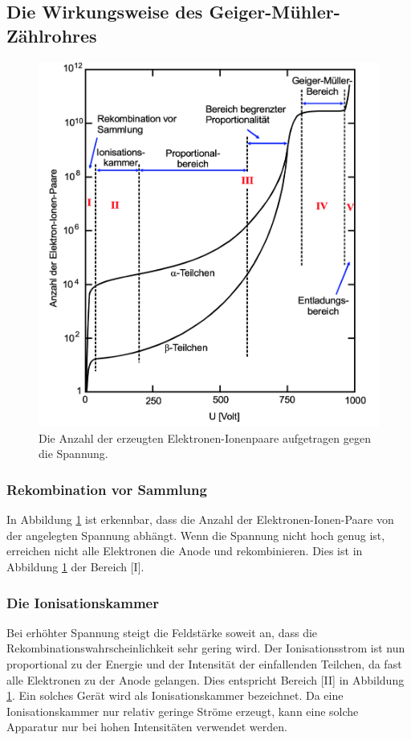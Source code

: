   \subsection{Die Wirkungsweise des Geiger-Mühler-Zählrohres}
    \begin{figure}[H]
      \centering
        \includegraphics[scale=0.4]{content/SpannungAnzahlElektronenGMZ.png}
        \caption{Die Anzahl der erzeugten Elektronen-Ionenpaare aufgetragen gegen die Spannung.}
          \label{fig:aufbau2}
    \end{figure}
    \noindent
    \subsubsection{Rekombination vor Sammlung}
      In Abbildung \ref{fig:aufbau2} ist erkennbar, dass die Anzahl der Elektronen-Ionen-Paare von der
      angelegten Spannung abhängt. Wenn die Spannung nicht hoch genug ist, erreichen nicht alle
      Elektronen die Anode und rekombinieren. Dies ist in Abbildung \ref{fig:aufbau2} der Bereich [I].
    \subsubsection{Die Ionisationskammer}
      Bei erhöhter Spannung steigt die Feldstärke soweit an, dass die Rekombinationswahrscheinlichkeit
      sehr gering wird. Der Ionisationsstrom ist nun proportional zu der Energie und der Intensität
      der einfallenden Teilchen, da fast alle Elektronen zu der Anode gelangen. Dies entspricht
      Bereich [II] in Abbildung \ref{fig:aufbau2}. Ein solches Gerät wird als Ionisationskammer
      bezeichnet. Da eine Ionisationskammer nur relativ geringe Ströme erzeugt, kann eine solche
      Apparatur nur bei hohen Intensitäten verwendet werden.
